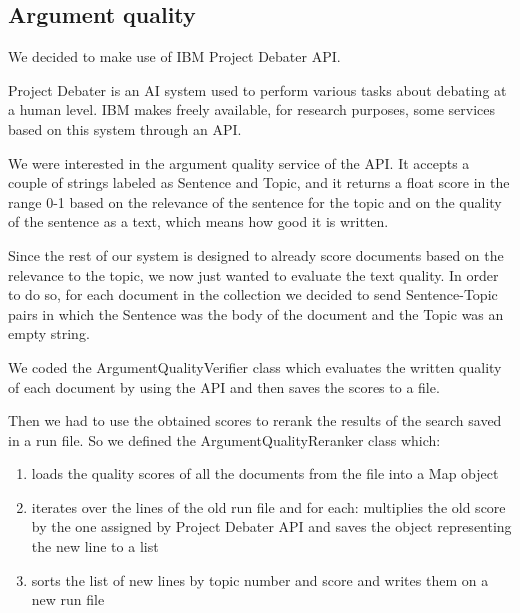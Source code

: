\subsection{Argument quality}
  \label{subsec:Argument quality}
  We decided to make use of IBM Project Debater API.
  
      Project Debater is an AI system used to perform various tasks about debating at a human level. IBM makes freely available, for research purposes, some services based on this system through an API. \citep{ProjectDebaterAPI}
      
      We were interested in the argument quality service of the API. It accepts a couple of strings labeled as Sentence and Topic, and it returns a float score in the range 0-1 based on the relevance of the sentence for the topic and on the quality of the sentence as a text, which means how good it is written.
      
      Since the rest of our system is designed to already score documents based on the relevance to the topic, we now just wanted to evaluate the text quality. In order to do so, for each document in the collection we decided to send Sentence-Topic pairs in which the Sentence was the body of the document and the Topic was an empty string.
      
      We coded the ArgumentQualityVerifier class which evaluates the written quality of each document by using the API and then saves the scores to a file.
      
      Then we had to use the obtained scores to rerank the results of the search saved in a run file. So we defined the ArgumentQualityReranker class which:
      
       \begin{enumerate} 
           \item loads the quality scores of all the documents from the file into a Map object \item iterates over the lines of the old run file and for each: multiplies the old score by the one assigned by Project Debater API and saves the object representing the new line to a list \item sorts the list of new lines by topic number and score and writes them on a new run file 
       \end{enumerate}